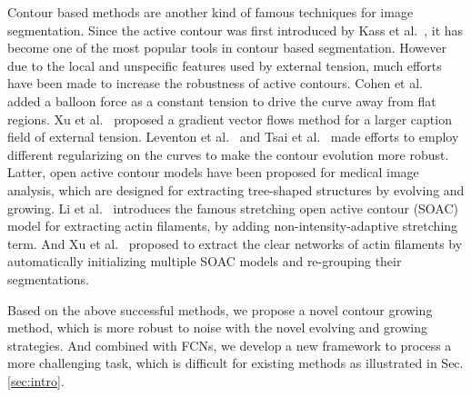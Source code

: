 Contour based methods are another kind of famous techniques for image segmentation.
Since the active contour was first introduced by Kass et al.~\cite{Kass1988}, it has become one of the most popular tools in contour based segmentation.
However due to the local and unspecific features used by external tension, much efforts have been made to increase the robustness of active contours.
Cohen et al.~\cite{Cohen1991} added a balloon force as a constant tension to drive the curve away from flat regions.
Xu et al.~\cite{Xu1998} proposed a gradient vector flows method for a larger caption field of external tension.
Leventon et al.~\cite{Leventon2003Statistical} and Tsai et al.~\cite{Tsai2003A}  made efforts to employ different regularizing on the curves to make the contour evolution more robust.
Latter, open active contour models have been proposed for medical image analysis, which are designed for extracting tree-shaped structures \cite{Li2009Actin,Xu2013EXTRACTION} by evolving and growing.
Li et al.~\cite{Li2009Actin} introduces the famous stretching open active contour (SOAC) model for extracting actin filaments, by adding non-intensity-adaptive stretching term.
And Xu et al.~\cite{Xu2013EXTRACTION} proposed to extract the clear networks of actin filaments by automatically initializing multiple SOAC models and re-grouping their segmentations.

Based on the above successful methods, we propose a novel contour growing method, which is more robust to noise with the novel evolving and growing strategies.
And combined with FCNs, we develop a new framework to process a more challenging task, which is difficult for existing methods as illustrated in Sec. \ref{sec:intro}.



